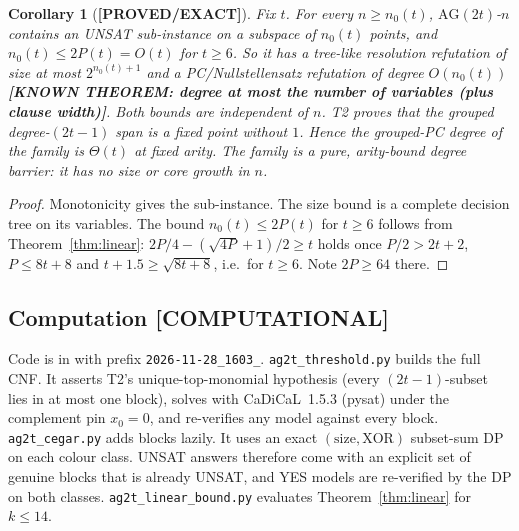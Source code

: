 \documentclass[11pt]{article}
\newtheorem{corollary}{Corollary}
\theoremstyle{definition}
\theoremstyle{remark}
\newcommand{\lab}[1]{\textbf{[#1]}}
\newcommand{\AG}{\mathrm{AG}}
\begin{document}
\begin{corollary}[\lab{PROVED/EXACT}]\label{cor:core}
Fix $t$. For every $n\ge n_0(t)$, $\AG(2t)$-$n$ contains an UNSAT sub-instance on a subspace
of $n_0(t)$ points, and $n_0(t)\le 2P(t)=O(t)$ for $t\ge6$. So it has a tree-like resolution
refutation of size at most $2^{n_0(t)+1}$ and a PC/Nullstellensatz refutation of degree
$O(n_0(t))$ \lab{KNOWN THEOREM: degree at most the number of variables (plus clause width)}.
Both bounds are independent of $n$. T2 proves that the grouped degree-$(2t-1)$ span is a fixed
point without $1$. Hence the grouped-PC degree of the family is $\Theta(t)$ at fixed arity. The
family is a pure, arity-bound degree barrier: it has no size or core growth in $n$.
\end{corollary}
\begin{proof}
Monotonicity gives the sub-instance. The size bound is a complete decision tree on its
variables. The bound $n_0(t)\le2P(t)$ for $t\ge6$ follows from Theorem~\ref{thm:linear}:
$2P/4-(\sqrt{4P}+1)/2\ge t$ holds once $P/2>2t+2$, $P\le 8t+8$ and
$t+1.5\ge\sqrt{8t+8}$, i.e.\ for $t\ge6$. Note $2P\ge64$ there.
\end{proof}

\subsection{Computation \lab{COMPUTATIONAL}}
Code is in  with prefix \texttt{2026-11-28\_1603\_}.
\texttt{ag2t\_threshold.py} builds the full CNF. It asserts T2's unique-top-monomial hypothesis
(every $(2t-1)$-subset lies in at most one block), solves with CaDiCaL~1.5.3 (pysat) under the
complement pin $x_0=0$, and re-verifies any model against every block.
\texttt{ag2t\_cegar.py} adds blocks lazily. It uses an exact $(\text{size},\text{XOR})$
subset-sum DP on each colour class. UNSAT answers therefore come with an explicit set of
genuine blocks that is already UNSAT, and YES models are re-verified by the DP on both
classes. \texttt{ag2t\_linear\_bound.py} evaluates Theorem~\ref{thm:linear} for
$k\le14$.
\end{document}
